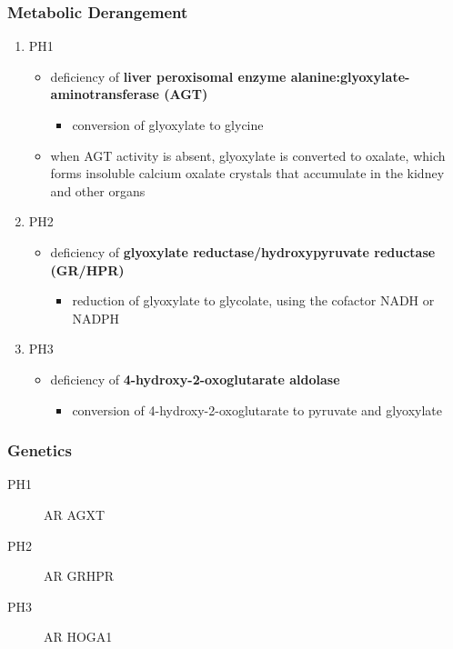 \documentclass[12pt]{scrartcl}
\begin{document}
\subsubsection{Metabolic Derangement}
\label{sec:org9018d96}
\begin{enumerate}
\item PH1
\label{sec:org300d4bd}
\begin{itemize}
\item deficiency of \textbf{liver peroxisomal enzyme alanine:glyoxylate-aminotransferase (AGT)}
\begin{itemize}
\item conversion of glyoxylate to glycine
\end{itemize}
\item when AGT activity is absent, glyoxylate is converted to oxalate,
which forms insoluble calcium oxalate crystals that accumulate in
the kidney and other organs
\end{itemize}
\item PH2
\label{sec:orgebc752d}
\begin{itemize}
\item deficiency of  \textbf{glyoxylate reductase/hydroxypyruvate reductase (GR/HPR)}
\begin{itemize}
\item reduction of glyoxylate to glycolate, using the cofactor NADH or NADPH
\end{itemize}
\end{itemize}
\item PH3
\label{sec:orge7a324f}
\begin{itemize}
\item deficiency of \textbf{4-hydroxy-2-oxoglutarate aldolase}
\begin{itemize}
\item conversion of 4-hydroxy-2-oxoglutarate to pyruvate and glyoxylate
\end{itemize}
\end{itemize}
\end{enumerate}
\subsubsection{Genetics}
\label{sec:org1d4cf74}
\begin{description}
\item[{PH1}] AR AGXT
\item[{PH2}] AR GRHPR
\item[{PH3}] AR HOGA1
\end{description}
\end{document}
